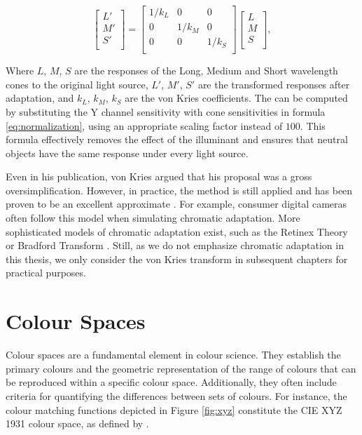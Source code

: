 \begin{equation}
\label{eq:vonkries}
\begin{bmatrix}
L' \\
M' \\
S' \\
\end{bmatrix}
=
\begin{bmatrix}
1/k_L & 0 & 0 \\
0 & 1/k_M & 0 \\
0 & 0 & 1/k_S \\
\end{bmatrix}
\begin{bmatrix}
L \\
M \\
S \\
\end{bmatrix}
,
\end{equation}

Where $L$, $M$, $S$ are the responses of the Long, Medium and Short wavelength cones to the original light source, $L'$, $M'$, $S'$ are the transformed responses after adaptation, and $k_L$, $k_M$, $k_S$ are the von Kries coefficients. The can be computed by substituting the Y channel sensitivity with cone sensitivities in formula \ref{eq:normalization}, using an appropriate scaling factor instead of $100$. This formula effectively removes the effect of the illuminant and ensures that neutral objects have the same response under every light source.

Even in his publication, von Kries argued that his proposal was a gross oversimplification. However, in practice, the method is still applied and has been proven to be an excellent approximate \cite[170-171]{fairchild}. For example, consumer digital cameras often follow this model when simulating chromatic adaptation. More sophisticated models of chromatic adaptation exist, such as the Retinex Theory \cite{land1977retinex} or Bradford Transform \cite{lam1985metamerism}. Still, as we do not emphasize chromatic adaptation in this thesis, we only consider the von Kries transform in subsequent chapters for practical purposes.


\section{Colour Spaces}

Colour spaces are a fundamental element in colour science. They establish the primary colours and the geometric representation of the range of colours that can be reproduced within a specific colour space. Additionally, they often include criteria for quantifying the differences between sets of colours. For instance, the colour matching functions depicted in Figure \ref{fig:xyz} constitute the CIE XYZ 1931 colour space, as defined by \cite{cie1931}.

